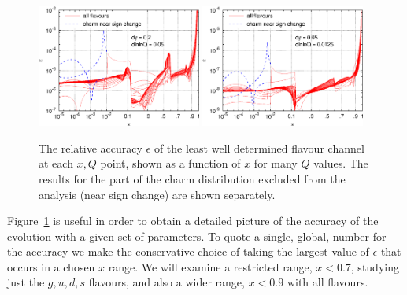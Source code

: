 \documentclass[12pt]{article}
\begin{document}
\begin{figure}
  \centering
  \includegraphics[width=0.48\textwidth]{../benchmarking/test_acc/acc-dy0.2-dlnlnQ0.05.eps}\hfill
  \includegraphics[width=0.48\textwidth]{../benchmarking/test_acc/acc-dy0.05-dlnlnQ0.0125.eps}
  \caption{The relative accuracy $\epsilon$ of the least well
    determined flavour channel at each $x, Q$ point, shown as a
    function of $x$ for many $Q$ values. The results for the part of
    the charm distribution excluded from the analysis (near sign
    change) are shown separately. }
  \label{fig:acc-fixed-dy-dlnlnQ}
\end{figure}

Figure~\ref{fig:acc-fixed-dy-dlnlnQ} is useful in order to obtain a
detailed picture of the accuracy of the evolution with a given set of
parameters. To quote a single, global, number for the accuracy we make
the conservative choice of taking the largest value of $\epsilon$ that
occurs in a chosen $x$ range. We will examine a restricted range,
$x<0.7$, studying just the $g,u,d,s$ flavours, and also a wider range,
$x<0.9$ with all flavours.
\end{document}
